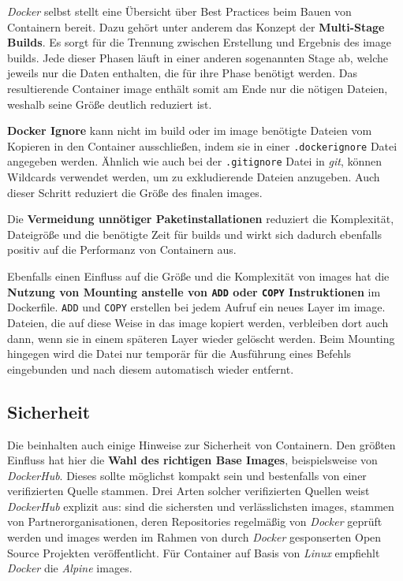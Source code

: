 \textit{Docker} selbst stellt eine Übersicht über Best Practices beim Bauen von Containern bereit. Dazu gehört unter anderem das Konzept der \textbf{Multi-Stage Builds}. Es sorgt für die Trennung zwischen Erstellung und Ergebnis des \Gls{image} \Glspl{build}. Jede dieser Phasen läuft in einer anderen sogenannten Stage ab, welche jeweils nur die Daten enthalten, die für ihre Phase benötigt werden. Das resultierende Container \Gls{image} enthält somit am Ende nur die nötigen Dateien, weshalb seine Größe deutlich reduziert ist. \cite{300:Building-Best-Practices}

\textbf{Docker Ignore} kann nicht im \Gls{build} oder im \Gls{image} benötigte Dateien vom Kopieren in den Container ausschließen, indem sie in einer \texttt{.dockerignore} Datei angegeben werden. Ähnlich wie auch bei der \texttt{.gitignore} Datei in \textit{\Gls{git}}, können Wildcards verwendet werden, um zu exkludierende Dateien anzugeben. Auch dieser Schritt reduziert die Größe des finalen \Glspl{image}. \cite{300:Building-Best-Practices}

Die \textbf{Vermeidung unnötiger Paketinstallationen} reduziert die Komplexität, Dateigröße und die benötigte Zeit für \Glspl{build} und wirkt sich dadurch ebenfalls positiv auf die Performanz von Containern aus. \cite{300:Building-Best-Practices}

Ebenfalls einen Einfluss auf die Größe und die Komplexität von \Glspl{image} hat die \textbf{Nutzung von Mounting anstelle von \texttt{ADD} oder \texttt{COPY} Instruktionen} im Dockerfile. \texttt{ADD} und \texttt{COPY} erstellen bei jedem Aufruf ein neues Layer im \Gls{image}. Dateien, die auf diese Weise in das \Gls{image} kopiert werden, verbleiben dort auch dann, wenn sie in einem späteren Layer wieder gelöscht werden. Beim Mounting hingegen wird die Datei nur temporär für die Ausführung eines Befehls eingebunden und nach diesem automatisch wieder entfernt. \cite{300:Building-Best-Practices}

\subsection{Sicherheit}
\label{subsec:05-03-02_security}

Die  beinhalten auch einige Hinweise zur Sicherheit von Containern. Den größten Einfluss hat hier die \textbf{Wahl des richtigen Base Images}, beispielsweise von \textit{DockerHub}. Dieses sollte möglichst kompakt sein und bestenfalls von einer verifizierten Quelle stammen. Drei Arten solcher verifizierten Quellen weist \textit{DockerHub} explizit aus:  sind die sichersten und verlässlichsten \Glspl{image},  stammen von Partnerorganisationen, deren Repositories regelmäßig von \textit{Docker} geprüft werden und  \Glspl{image} werden im Rahmen von durch \textit{Docker} gesponserten Open Source Projekten veröffentlicht. Für Container auf Basis von \textit{Linux} empfiehlt \textit{Docker} die \textit{Alpine} \Glspl{image}. \cite{300:Building-Best-Practices}

